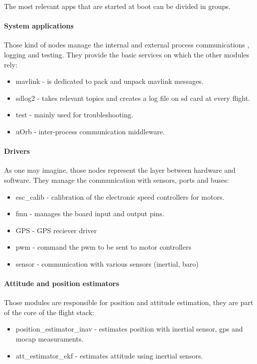 The most relevant apps that are started at boot can be divided in groups. \\

\noindent
\paragraph{System applications} Those kind of nodes manage the internal and external process communications , logging and testing. They provide the basic services on which the other modules rely:	
\begin{itemize}
	\item mavlink - is dedicated to pack and unpack mavlink messages.
	\item sdlog2 - takes relevant topics and creates a log file on sd card at every flight.
	\item test - mainly used for troubleshooting.
	\item uOrb - inter-process communication middleware.
\end{itemize}
\paragraph{Drivers} As one may imagine, those nodes represent the layer between hardware and software. They manage the communication with sensors, ports and buses:
\begin{itemize}
	\item esc\_calib - calibration of the electronic speed controllers for motors.
	\item fmu - manages the board input and output pins.
	\item GPS - GPS reciever driver
	\item pwm - command the pwm to be sent to motor controllers
	\item sensor - communication with various sensors (inertial, baro)
\end{itemize}
\paragraph{Attitude and position estimators} Those modules are responsible for position and attitude estimation, they are part of the core of the flight stack:
\begin{itemize}
	\item position\_estimator\_inav - estimates position with inertial sensor, gps and mocap measuraments.
	\item att\_estimator\_ekf - estimates attitude using inertial sensors.
\end{itemize}
